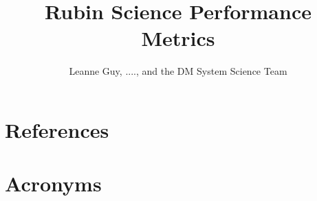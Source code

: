 \documentclass[OPS,authoryear,lsstdraft,toc]{lsstdoc}
\title{Rubin Science Performance Metrics}
\author{%
Leanne Guy, ....,  and the DM System Science Team
}
\date{\vcsDate}
\begin{document}
\maketitle





\appendix
 

\section{References} \label{sec:bib}
\renewcommand{\refname}{} %


\section{Acronyms} \label{sec:acronyms}

\end{document}
